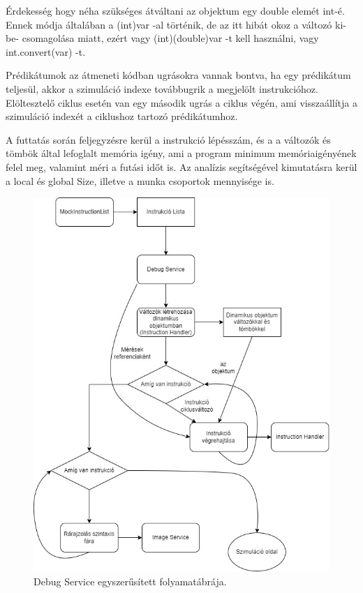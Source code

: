 Érdekesség hogy néha szükséges átváltani az objektum egy double elemét int-é. Ennek módja általában a (int)var -al történik, de az itt hibát okoz a változó ki-be- csomagolása miatt, ezért vagy (int)(double)var -t kell használni, vagy int.convert(var) -t.

Prédikátumok az átmeneti kódban ugrásokra vannak bontva, ha egy prédikátum teljesül, akkor a szimuláció indexe továbbugrik a megjelölt instrukcióhoz. Elöltesztelő ciklus esetén van egy második ugrás a ciklus végén, ami visszaállítja a szimuláció indexét a ciklushoz tartozó prédikátumhoz.

A futtatás során feljegyzésre kerül a instrukció lépésszám, és a a változók és tömbök által lefoglalt memória igény, ami a program minimum memóriaigényének felel meg, valamint méri a futási időt is. Az analízis segítségével kimutatásra kerül a local és global Size, illetve a munka csoportok mennyisége is.

\begin{figure}[h]
\centering
\includegraphics[scale=0.5]{images/SimpleDebug.jpg}
\caption{Debug Service egyszerűsített folyamatábrája.}
\label{fig:debugflow}
\end{figure}

